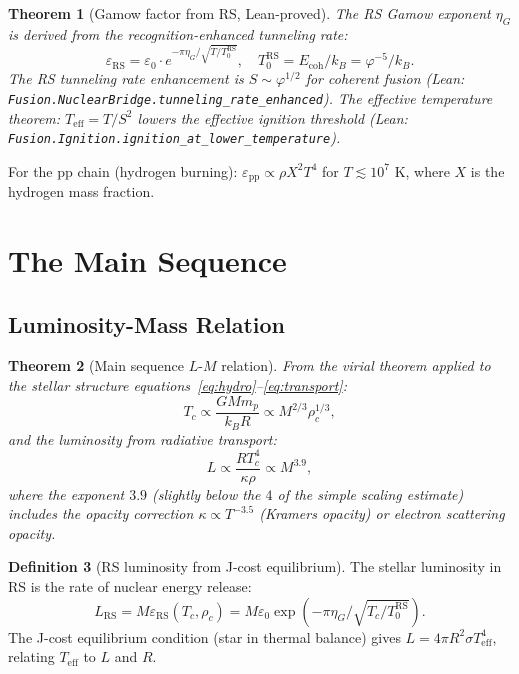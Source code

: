 \documentclass[12pt,a4paper]{article}
\newtheorem{theorem}{Theorem}[section]
\theoremstyle{definition}
\newtheorem{definition}[theorem]{Definition}
\theoremstyle{remark}
\begin{document}
\begin{theorem}[Gamow factor from RS, Lean-proved]\label{thm:gamow}
The RS Gamow exponent $\eta_G$ is derived from the recognition-enhanced
tunneling rate:
\begin{equation}
  \varepsilon_\mathrm{RS} = \varepsilon_0 \cdot
  e^{-\pi\eta_G/\sqrt{T/T_0^\mathrm{RS}}},
  \quad T_0^\mathrm{RS} = E_\mathrm{coh}/k_B = \varphi^{-5}/k_B.
\end{equation}
The RS tunneling rate enhancement is $S \sim \varphi^{1/2}$ for
coherent fusion (Lean: \texttt{Fusion.NuclearBridge.tunneling\_rate\_enhanced}).
The effective temperature theorem: $T_\mathrm{eff} = T/S^2$ lowers
the effective ignition threshold (Lean: \texttt{Fusion.Ignition.ignition\_at\_lower\_temperature}).
\end{theorem}

For the pp chain (hydrogen burning):
$\varepsilon_\mathrm{pp} \propto \rho X^2 T^4$ for $T \lesssim 10^7$ K,
where $X$ is the hydrogen mass fraction.

\section{The Main Sequence}
\label{sec:mainsequence}

\subsection{Luminosity-Mass Relation}

\begin{theorem}[Main sequence $L$-$M$ relation]\label{thm:LM}
From the virial theorem applied to the stellar structure
equations~\eqref{eq:hydro}--\eqref{eq:transport}:
\begin{equation}
  T_c \propto \frac{GM m_p}{k_B R} \propto M^{2/3} \rho_c^{1/3},
  \label{eq:Tc}
\end{equation}
and the luminosity from radiative transport:
\begin{equation}
  L \propto \frac{R T_c^4}{\kappa \rho} \propto M^{3.9},
  \label{eq:LM}
\end{equation}
where the exponent $3.9$ (slightly below the $4$ of the simple scaling
estimate) includes the opacity correction $\kappa \propto T^{-3.5}$
(Kramers opacity) or electron scattering opacity.
\end{theorem}

\begin{definition}[RS luminosity from J-cost equilibrium]
The stellar luminosity in RS is the rate of nuclear energy release:
\begin{equation}
  L_\mathrm{RS} = M \varepsilon_\mathrm{RS}(T_c, \rho_c)
  = M \varepsilon_0 \exp\!\left(-\pi\eta_G/\sqrt{T_c/T_0^\mathrm{RS}}\right).
  \label{eq:L_RS}
\end{equation}
The J-cost equilibrium condition (star in thermal balance) gives $L =
4\pi R^2 \sigma T_\mathrm{eff}^4$, relating $T_\mathrm{eff}$ to $L$ and $R$.
\end{definition}
\end{document}
